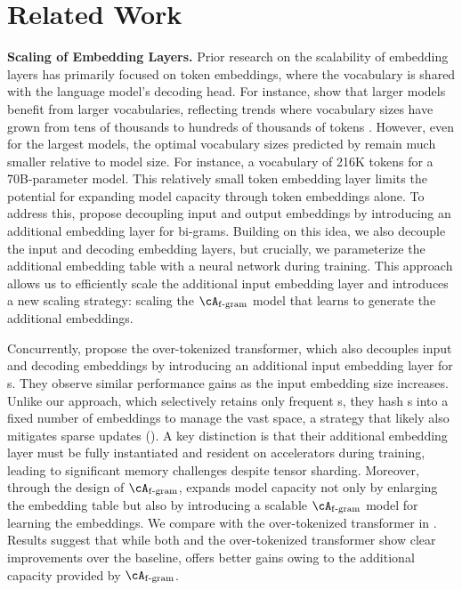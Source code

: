 
\section{Related Work}\label{sec:related_work}


\textbf{Scaling of Embedding Layers.} Prior research on the scalability of embedding layers has primarily focused on token embeddings, where the vocabulary is shared with the language model’s decoding head. For instance, \citet{tao2024scaling} show that larger models benefit from larger vocabularies, reflecting trends where vocabulary sizes have grown from tens of thousands \citep{devlin2019bert,radford2019language} to hundreds of thousands of tokens \citep{google2024gemma,adler2024nemotron,dubey2024llama,liu2024deepseek}. However, even for the largest models, the optimal vocabulary sizes predicted by \citet{tao2024scaling} remain much smaller relative to model size. For instance, a vocabulary of 216K tokens for a 70B-parameter model. This relatively small token embedding layer limits the potential for expanding model capacity through token embeddings alone. To address this, \citet{roy2022n} propose decoupling input and output embeddings by introducing an additional  embedding layer for bi-grams. Building on this idea, we also decouple the input and decoding embedding layers, but crucially, we parameterize the additional embedding table with a neural network during training. This approach allows us to efficiently scale the additional input embedding layer and introduces a new scaling strategy: scaling the $\Afgram$ model that learns to generate the additional embeddings.

Concurrently, \citet{huang2025over} propose the over-tokenized transformer, which also decouples input and decoding embeddings by introducing an additional input embedding layer for s. They observe similar performance gains as the input embedding size increases.
Unlike our approach, which selectively retains only frequent s, they hash s into a fixed number of embeddings to manage the vast  space, a strategy that likely also mitigates sparse updates (). A key distinction is that their additional embedding layer must be fully instantiated and resident on accelerators during training, leading to significant memory challenges despite tensor sharding. Moreover, through the design of $\Afgram$, \SCONE expands model capacity not only by enlarging the embedding table but also by introducing a scalable $\Afgram$ model for learning the embeddings. We compare \SCONE with the over-tokenized transformer in . Results suggest that while both \SCONE and the over-tokenized transformer show clear improvements over the baseline, \SCONE offers better gains owing to the additional capacity provided by $\Afgram$.


